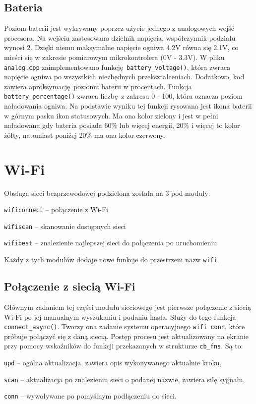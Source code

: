 \documentclass[polish]{aghengthesis}
\let\tempone\itemize
\let\temptwo\enditemize
\renewenvironment{itemize}{\tempone\setlength{\itemsep}{0cm}}{\temptwo}
\begin{document}
		\subsection{Bateria}
			Poziom baterii jest wykrywany poprzez użycie jednego z analogowych wejść procesora. Na wejściu zastosowano dzielnik napięcia, współczynnik podziału wynosi 2. Dzięki niemu maksymalne napięcie ogniwa 4.2V równa się 2.1V, co mieści się w zakresie pomiarowym mikrokontrolera (0V - 3.3V). W pliku \lstinline|analog.cpp| zaimplementowano funkcję \lstinline|battery_voltage()|, która zwraca napięcie ogniwa po wszystkich niezbędnych przekształceniach. Dodatkowo, kod zawiera aproksymację poziomu baterii w procentach. Funkcja \lstinline|battery_percentage()| zwraca liczbę z zakresu 0 - 100, która oznacza poziom naładowania ogniwa. Na podstawie wyniku tej funkcji rysowana jest ikona baterii w górnym pasku ikon statusowych. Ma ona kolor zielony i jest w pełni naładowana gdy bateria posiada 60\% lub więcej energii, 20\% i więcej to kolor żółty, natomiast poniżej 20\% ma ona kolor czerwony.
		
	\section{Wi-Fi}
		Obsługa sieci bezprzewodowej podzielona została na 3 pod-moduły:
		\begin{itemize}
			\item \lstinline|wificonnect| -- połączenie z Wi-Fi
			\item \lstinline|wifiscan| -- skanowanie dostępnych sieci
			\item \lstinline|wifibest| -- znalezienie najlepszej sieci do połączenia po uruchomieniu
		\end{itemize}
		
		Każdy z tych modułów dodaje nowe funkcje do przestrzeni nazw \lstinline|wifi|.
		
		\subsection{Połączenie z siecią Wi-Fi}
			Głównym zadaniem tej części modułu sieciowego jest pierwsze połączenie z siecią Wi-Fi po jej manualnym wyszukaniu i podaniu hasła. Służy do tego funkcja \lstinline|connect_async()|. Tworzy ona zadanie systemu operacyjnego \lstinline|wifi conn|, które próbuje połączyć się z daną siecią. Postęp procesu jest aktualizowany na ekranie przy pomocy wskaźników do funkcji przekazanych w strukturze \lstinline|cb_fns|. Są to:
			\begin{itemize}
				\item \lstinline|upd| -- ogólna aktualizacja, zawiera opis wykonywanego aktualnie kroku,
				\item \lstinline|scan| -- aktualizacja po znalezieniu sieci o podanej nazwie, zawiera siłę sygnału,
				\item \lstinline|conn| -- wywoływane po pomyślnym podłączeniu do sieci.
			\end{itemize}
			
\end{document}
